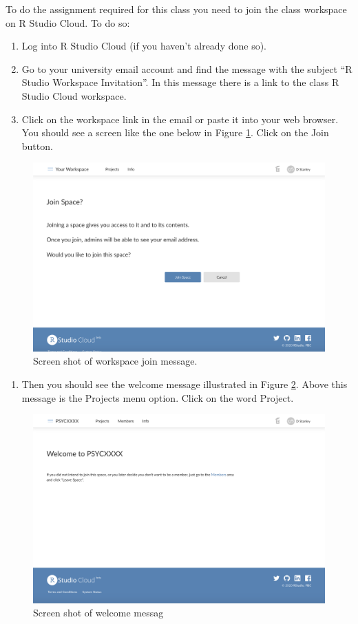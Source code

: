 \documentclass[
]{krantz}
\providecommand{\tightlist}{%
  \setlength{\itemsep}{0pt}\setlength{\parskip}{0pt}}
\begin{document}
To do the assignment required for this class you need to join the class workspace on R Studio Cloud. To do so:

\begin{enumerate}
\def\labelenumi{\arabic{enumi}.}
\item
  Log into R Studio Cloud (if you haven't already done so).
\item
  Go to your university email account and find the message with the subject ``R Studio Workspace Invitation''. In this message there is a link to the class R Studio Cloud workspace.
\item
  Click on the workspace link in the email or paste it into your web browser. You should see a screen like the one below in Figure \ref{fig:join}. Click on the Join button.
\end{enumerate}

\begin{figure}
\includegraphics[width=0.7\linewidth]{ch_introduction/images/screenshot_join} \caption{Screen shot of workspace join message.}\label{fig:join}
\end{figure}

\begin{enumerate}
\def\labelenumi{\arabic{enumi}.}
\setcounter{enumi}{3}
\tightlist
\item
  Then you should see the welcome message illustrated in Figure \ref{fig:welcome}. Above this message is the Projects menu option. Click on the word Project.
\end{enumerate}

\begin{figure}
\includegraphics[width=0.7\linewidth]{ch_introduction/images/screenshot_welcome} \caption{Screen shot of welcome messag}\label{fig:welcome}
\end{figure}
\end{document}
